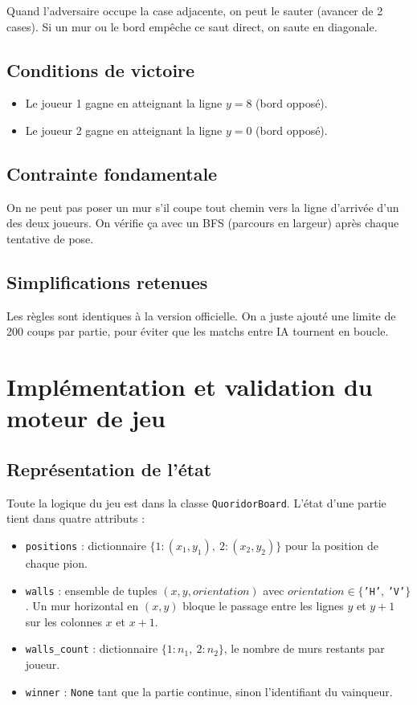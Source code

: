 \documentclass[a4paper, 12pt]{report}
\begin{document}
Quand l'adversaire occupe la case adjacente, on peut le sauter (avancer de 2 cases). Si un mur ou le bord empêche ce saut direct, on saute en diagonale.

\subsection{Conditions de victoire}

\begin{itemize}
    \item Le joueur 1 gagne en atteignant la ligne $y=8$ (bord opposé).
    \item Le joueur 2 gagne en atteignant la ligne $y=0$ (bord opposé).
\end{itemize}

\subsection{Contrainte fondamentale}

On ne peut pas poser un mur s'il coupe tout chemin vers la ligne d'arrivée d'un des deux joueurs. On vérifie ça avec un BFS (parcours en largeur) après chaque tentative de pose.

\subsection{Simplifications retenues}

Les règles sont identiques à la version officielle. On a juste ajouté une limite de 200 coups par partie, pour éviter que les matchs entre IA tournent en boucle.

\section{Implémentation et validation du moteur de jeu}

\subsection{Représentation de l'état}

Toute la logique du jeu est dans la classe \texttt{QuoridorBoard}. L'état d'une partie tient dans quatre attributs :

\begin{itemize}
    \item \texttt{positions} : dictionnaire $\{1: (x_1, y_1),\ 2: (x_2, y_2)\}$ pour la position de chaque pion.
    \item \texttt{walls} : ensemble de tuples $(x, y, orientation)$ avec $orientation \in \{$\texttt{'H'}, \texttt{'V'}$\}$. Un mur horizontal en $(x,y)$ bloque le passage entre les lignes $y$ et $y+1$ sur les colonnes $x$ et $x+1$.
    \item \texttt{walls\_count} : dictionnaire $\{1: n_1,\ 2: n_2\}$, le nombre de murs restants par joueur.
    \item \texttt{winner} : \texttt{None} tant que la partie continue, sinon l'identifiant du vainqueur.
\end{itemize}
\end{document}
